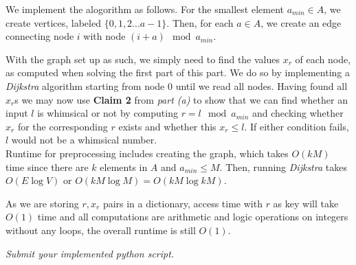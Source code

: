 \documentclass[12pt,twoside]{article}
\begin{document}
\begin{problems}
\begin{problemparts}
\problempart %
We implement the alogorithm as follows. For the smallest element  $a_{min} \in A$, we create vertices, labeled $\{0,1,2...a-1\}$. Then, for each $a \in A$, we create an edge connecting node $i$ with node $(i+a) \mod a_{min}$.
\begin{figure}[!h]
\centering
{}
\end{figure}
 
\problempart  %
With the graph set up as such, we simply need to find the values $x_r$ of each node, as computed when solving the first part of this part. We do so by implementing a \emph{Dijkstra} algorithm starting from node $0$ until we read all nodes. Having found all $x_r$s we may now use \textbf{Claim 2} from \emph{part (a)} to show that we can find whether an input $l$ is whimsical or not by computing $r = l \mod a_{min}$ and checking whether $x_r$ for the corresponding $r$ exists and whether this $x_r \leq l$. If either condition fails, $l$ would not be a whimsical number.\\

Runtime for preprocessing includes creating the graph, which takes $O(kM)$ time since there are $k$ elements in $A$ and $a_{min} \leq M$. Then, running \emph{Dijkstra} takes $O(E \log V)$ or $O(kM \log M) = O(kM \log kM)$.

As we are storing $r, x_r$ pairs in a dictionary, access time with $r$ as key will take $O(1)$ time and all computations are arithmetic and logic operations on integers without any loops, the overall runtime is still $O(1)$.

\problempart \emph{Submit your implemented python script.}  %

\end{problemparts}
\end{problems}
\end{document}
